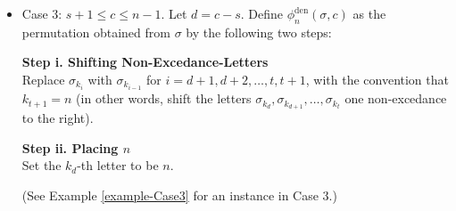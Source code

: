 \documentclass[12pt]{article}
\begin{document}
\begin{framed}
\begin{itemize}[leftmargin=1.5em]
(See Example \ref{example-Case2} for an instance in Case 2.)

\vskip 2pt	
\item[$\bullet$] Case 3: $s+1\leq c\leq n-1$.
Let $d=c-s$. 
Define $\phi_{n}^{\text{den}}(\sigma,c)$ as the permutation obtained from $\sigma$ by the following two steps:

\vskip 2pt		

\textbf{Step i. Shifting Non-Excedance-Letters}\\
Replace $\sigma_{k_{i}}$ with $\sigma_{k_{i-1}}$ for $i=d+1,d+2,\ldots,t,t+1$, with the convention that $k_{t+1}=n$
(in other words, shift the letters $\sigma_{k_{d}},\sigma_{k_{d+1}},\ldots,\sigma_{k_{t}}$
one non-excedance to the right).

\vskip 2pt		

\textbf{Step ii. Placing $n$} \\
Set the $k_{d}$-th letter to be $n$.    

(See Example \ref{example-Case3} for an instance in Case 3.)
\end{itemize}
\end{framed}
\end{document}
